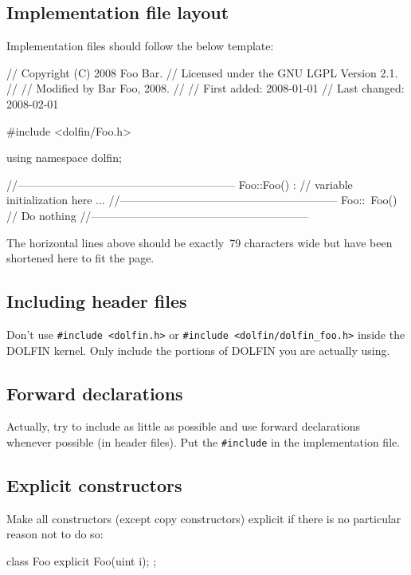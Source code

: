 \subsection{Implementation file layout}

Implementation files should follow the below template:
\begin{code}
// Copyright (C) 2008 Foo Bar.
// Licensed under the GNU LGPL Version 2.1.
//
// Modified by Bar Foo, 2008.
//
// First added:  2008-01-01
// Last changed: 2008-02-01

#include <dolfin/Foo.h>

using namespace dolfin;

//-----------------------------------------------------------
Foo::Foo() : // variable initialization here
{
  ...
}
//-----------------------------------------------------------
Foo::~Foo()
{
  // Do nothing
}
//-----------------------------------------------------------
\end{code}

The horizontal lines above should be exactly~79 characters
wide but have been shortened here to fit the page.

\subsection{Including header files}

Don't use \texttt{\#include <dolfin.h>} or \texttt{\#include
  <dolfin/dolfin\_foo.h>} inside the DOLFIN kernel. Only include the
portions of DOLFIN you are actually using.

\subsection{Forward declarations}

Actually, try to include as little as possible and use forward
declarations whenever possible (in header files). Put the
\texttt{\#include} in the implementation file.

\subsection{Explicit constructors}

Make all constructors (except copy constructors) explicit if there is no particular
reason not to do so:
\begin{code}
class Foo
{
  explicit Foo(uint i);
};
\end{code}

